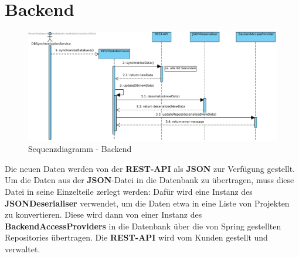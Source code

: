 


\section{Backend}

\begin{figure}[h]
	\centering
	\includegraphics[width=\linewidth]{img/diagrams/RESThandling.pdf}	
	\caption{Sequenzdiagramm - Backend}
	\label{fig:sequenz-backend}
\end{figure}

\noindent
Die neuen Daten werden von der \textbf{REST-API} als \textbf{JSON} zur Verfügung gestellt. Um die Daten aus der \textbf{JSON}-Datei in die Datenbank zu übertragen, muss  diese Datei in seine Einzelteile zerlegt werden: Dafür wird eine Instanz des \textbf{JSONDeserialiser} verwendet, um die Daten etwa in eine Liste von Projekten zu konvertieren. Diese wird dann von einer Instanz des \textbf{BackendAccessProviders} in die Datenbank über die von Spring gestellten Repositories übertragen.
Die \textbf{REST-API} wird vom Kunden gestellt und verwaltet.

\clearpage

